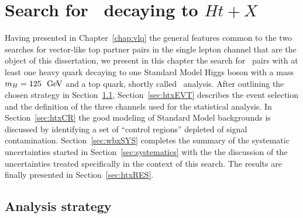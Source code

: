 \clearpage{\pagestyle{empty}\cleardoublepage}

\chapter{Search for \TTbar\ decaying to $Ht+X$}\label{chap:htx}

Having presented in Chapter~\ref{chap:vlq} the general features
common to the two searches for vector-like top partner pairs
in the single lepton channel that are the object of this dissertation,
we present in this chapter the search for \TTbar\ pairs with
at least one heavy quark decaying to one Standard Model Higgs boson 
with a mass $m_H= 125~\gev$ and a top
quark, shortly called \htx\ analysis.
After outlining the chosen strategy in Section~\ref{sec:htxMULT},
Section~\ref{sec:htxEVT} describes the event selection and the
definition of the three channels used for the statistical analysis.
In Section~\ref{sec:htxCR} the good modeling of Standard Model backgrounds
is discussed by identifying a set of ``control regions'' depleted of
signal contamination.
Section~\ref{sec:wbxSYS} completes the summary of the 
systematic uncertainties started in Section~\ref{sec:systematics}
with the the discussion of the uncertainties treated specifically
in the context of this search.
The results are finally presented in Section~\ref{sec:htxRES}.

\section{Analysis strategy}\label{sec:htxMULT}

